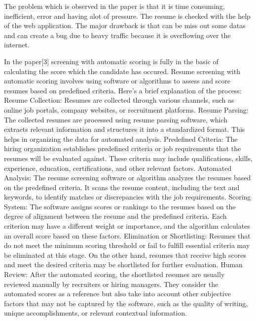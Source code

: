 \documentclass[12 pt, oneside]{book}
\begin{document}
\newline
The problem which is observed in the paper is that it is time consuming, inefficient, error and having alot of pressure.
The resume is checked with the help of the web application.
The major drawback is that can be miss out some datas and can create a bug due to heavy traffic because it is overflowing over the internet.
\bigskip
\par In the paper[3] screening with automatic scoring is fully in the basic of calculating the score which the candidate has occured.
Resume screening with automatic scoring involves using software or algorithms to assess and score resumes based on predefined criteria. Here's a brief explanation of the process:
\newline
Resume Collection: Resumes are collected through various channels, such as online job portals, company websites, or recruitment platforms.
\newline
Resume Parsing: The collected resumes are processed using resume parsing software, which extracts relevant information and structures it into a standardized format. This helps in organizing the data for automated analysis.
\newline
Predefined Criteria: The hiring organization establishes predefined criteria or job requirements that the resumes will be evaluated against. These criteria may include qualifications, skills, experience, education, certifications, and other relevant factors.
\newline
Automated Analysis: The resume screening software or algorithm analyzes the resumes based on the predefined criteria. It scans the resume content, including the text and keywords, to identify matches or discrepancies with the job requirements.
\newline
Scoring System: The software assigns scores or rankings to the resumes based on the degree of alignment between the resume and the predefined criteria. Each criterion may have a different weight or importance, and the algorithm calculates an overall score based on these factors.
\newline
Elimination or Shortlisting: Resumes that do not meet the minimum scoring threshold or fail to fulfill essential criteria may be eliminated at this stage. On the other hand, resumes that receive high scores and meet the desired criteria may be shortlisted for further evaluation.
\newline
Human Review: After the automated scoring, the shortlisted resumes are usually reviewed manually by recruiters or hiring managers. They consider the automated scores as a reference but also take into account other subjective factors that may not be captured by the software, such as the quality of writing, unique accomplishments, or relevant contextual information.
\end{document}
